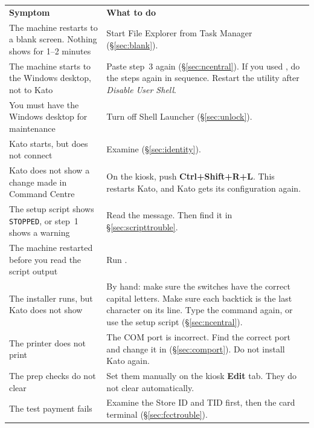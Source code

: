 \documentclass[a4paper,10pt]{article}
\begin{document}
\begin{center}
\renewcommand{\arraystretch}{1.35}\small
\begin{tabularx}{\textwidth}{L{50mm} X}
\color{white}\textbf{Symptom} &
\color{white}\textbf{What to do}\\
The machine restarts to a blank screen. Nothing shows for 1--2 minutes &
Start File Explorer from Task Manager (\S\ref{sec:blank}).\\
The machine starts to the Windows desktop, not to Kato &
Paste step~3 again (\S\ref{sec:ncentral}). If you used
, do the steps again in sequence. Restart the utility
after \emph{Disable User Shell}.\\
You must have the Windows desktop for maintenance &
Turn off Shell Launcher (\S\ref{sec:unlock}).\\
Kato starts, but does not connect &
Examine  (\S\ref{sec:identity}).\\
Kato does not show a change made in Command Centre &
On the kiosk, push \textbf{Ctrl+Shift+R+L}. This restarts Kato, and Kato gets its
configuration again.\\
The setup script shows \texttt{STOPPED}, or step~1 shows a warning &
Read the message. Then find it in \S\ref{sec:scripttrouble}.\\
The machine restarted before you read the script output &
Run .\\
The installer runs, but Kato does not show &
By hand: make sure the switches have the correct capital letters. Make
sure each backtick is the last character on its line. Type the command
again, or use the setup script (\S\ref{sec:ncentral}).\\
The printer does not print &
The COM port is incorrect. Find the correct port and change it in
 (\S\ref{sec:comport}). Do not install Kato
again.\\
The prep checks do not clear &
Set them manually on the kiosk \textbf{Edit} tab. They do not clear
automatically.\\
The test payment fails &
Examine the Store ID and TID first, then the card terminal
(\S\ref{sec:fcctrouble}).\\
\end{tabularx}
\end{center}
\end{document}
